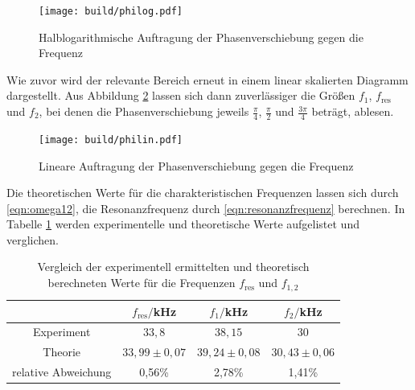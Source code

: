 \begin{figure}
  \centering
  \texttt{[image: build/philog.pdf]}
  \caption{Halblogarithmische Auftragung der Phasenverschiebung gegen die Frequenz}
  \label{fig:philog}
\end{figure}

Wie zuvor wird der relevante Bereich erneut in einem linear skalierten Diagramm
dargestellt. Aus Abbildung \ref{fig:philin} lassen sich dann zuverlässiger die Größen
$f_1$, $f_\text{res}$ und $f_2$, bei denen die Phasenverschiebung jeweils $\frac{\pi}{4}$,
$\frac{\pi}{2}$ und $\frac{3\pi}{4}$ beträgt, ablesen.

\begin{figure}
  \centering
  \texttt{[image: build/philin.pdf]}
  \caption{Lineare Auftragung der Phasenverschiebung gegen die Frequenz}
  \label{fig:philin}
\end{figure}

Die theoretischen Werte für die charakteristischen Frequenzen lassen sich durch
\eqref{eqn:omega12}, die Resonanzfrequenz durch \eqref{eqn:resonanzfrequenz} berechnen. In Tabelle \ref{tab:frequenzvergleich} werden experimentelle und theoretische
Werte aufgelistet und verglichen.
\begin{table}
\centering
\begin{tabular}{cccc}
\toprule
& $f_\mathrm{res}/$kHz & $f_1/$kHz & $f_2/$kHz \\
\midrule
Experiment & $33,8$ & $38,15$ & $30$\\
Theorie & $33,99 \pm 0,07 $ & $ 39,24 \pm 0,08$ & $30,43 \pm 0,06$ \\
\hline
relative Abweichung & 0,56\% & 2,78\% & 1,41\%\\
\bottomrule
\end{tabular}
\caption{Vergleich der experimentell ermittelten und theoretisch berechneten Werte für die Frequenzen $f_\mathrm{res}$ und $f_{1,2}$}
\label{tab:frequenzvergleich}
\end{table}
